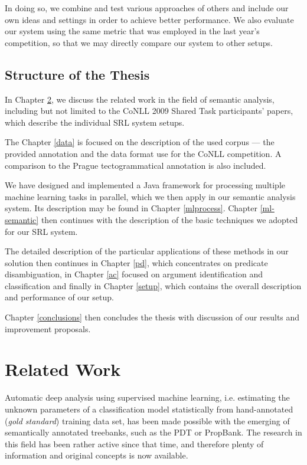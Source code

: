 \documentclass[12pt,notitlepage]{report}
\begin{document}
In doing so, we combine and test various approaches of others and include our own ideas and settings in order to achieve better performance. We also evaluate our system using the same metric that was employed in the last year's competition, so that we may directly compare our system to other setups.

\section{Structure of the Thesis}

In Chapter \ref{related}, we discuss the related work in the field of semantic analysis, including but not limited to the CoNLL 2009 Shared Task participants' papers, which describe the individual SRL system setups.

The Chapter \ref{data} is focused on the description of the used corpus --- the provided annotation and the data format use for the CoNLL competition. A comparison to the Prague tectogrammatical annotation \citep{cinkova09} is also included.

We have designed and implemented a Java framework for processing multiple machine learning tasks in parallel, which we then apply in our semantic analysis system. Its description may be found in Chapter \ref{mlprocess}. Chapter \ref{ml-semantic} then continues with the description of the basic techniques we adopted for our SRL system. 

The detailed description of the particular applications of these methods in our solution then continues in Chapter \ref{pd}, which concentrates on predicate disambiguation, in Chapter \ref{ac} focused on argument identification and classification and finally in Chapter \ref{setup}, which contains the overall description and performance of our setup.

Chapter \ref{conclusions} then concludes the thesis with discussion of our results and improvement proposals.

%
%
\chapter{Related Work}\label{related}
%
%

Automatic deep analysis using supervised machine learning, i.e. estimating the unknown parameters of a classification model statistically from hand-annotated (\emph{gold standard}) training data set, has been made possible with the emerging of semantically annotated treebanks, such as the PDT or PropBank. The research in this field has been rather active since that time, and therefore plenty of information and original concepts is now available. 
\end{document}
